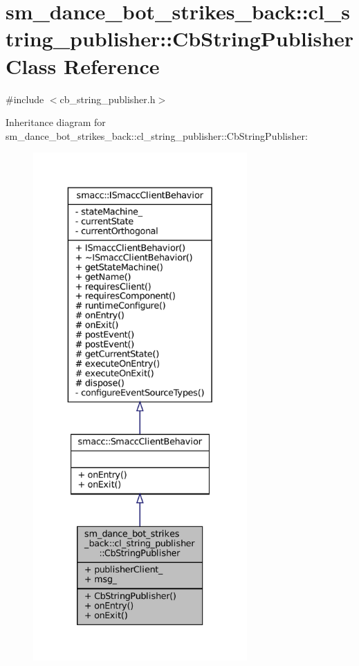 \hypertarget{classsm__dance__bot__strikes__back_1_1cl__string__publisher_1_1CbStringPublisher}{}\section{sm\+\_\+dance\+\_\+bot\+\_\+strikes\+\_\+back\+:\+:cl\+\_\+string\+\_\+publisher\+:\+:Cb\+String\+Publisher Class Reference}
\label{classsm__dance__bot__strikes__back_1_1cl__string__publisher_1_1CbStringPublisher}


{\ttfamily \#include $<$cb\+\_\+string\+\_\+publisher.\+h$>$}



Inheritance diagram for sm\+\_\+dance\+\_\+bot\+\_\+strikes\+\_\+back\+:\+:cl\+\_\+string\+\_\+publisher\+:\+:Cb\+String\+Publisher\+:
\nopagebreak
\begin{figure}[H]
\begin{center}
\leavevmode
\includegraphics[height=550pt]{classsm__dance__bot__strikes__back_1_1cl__string__publisher_1_1CbStringPublisher__inherit__graph}
\end{center}
\end{figure}


